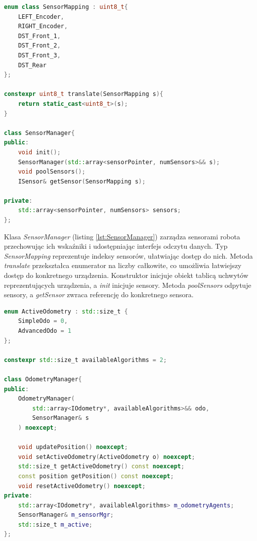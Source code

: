 \documentclass[12pt,twoside]{article}
\begin{document}
\begin{lstlisting}[language=C++, caption={Klasa SensorManager}, label={lst:SensorManager}]
enum class SensorMapping : uint8_t{ 
    LEFT_Encoder,
    RIGHT_Encoder,
    DST_Front_1,
    DST_Front_2,
    DST_Front_3,
    DST_Rear
};

constexpr uint8_t translate(SensorMapping s){
    return static_cast<uint8_t>(s);
}

class SensorManager{
public:
    void init();
    SensorManager(std::array<sensorPointer, numSensors>&& s);
    void poolSensors();
    ISensor& getSensor(SensorMapping s);

private:
    std::array<sensorPointer, numSensors> sensors;
};
\end{lstlisting}

Klasa \textit{SensorManager} (listing \ref{lst:SensorManager}) zarządza sensorami robota przechowując ich wskaźniki i udostępniając interfejs odczytu danych. Typ \textit{SensorMapping} reprezentuje indeksy sensorów, ułatwiając dostęp do nich. Metoda \textit{translate} przekształca enumerator na liczby całkowite, co umożliwia łatwiejszy dostęp do konkretnego urządzenia. Konstruktor inicjuje obiekt tablicą uchwytów reprezentujących urządzenia, a \textit{init} inicjuje sensory. Metoda \textit{poolSensors} odpytuje sensory, a \textit{getSensor} zwraca referencję do konkretnego sensora.

\newpage

\begin{lstlisting}[language=C++, caption={Klasa OdometryManager}, label={lst:OdometryManager}]
enum ActiveOdometry : std::size_t {
    SimpleOdo = 0,
    AdvancedOdo = 1
};

constexpr std::size_t availableAlgorithms = 2;

class OdometryManager{
public:
    OdometryManager(
        std::array<IOdometry*, availableAlgorithms>&& odo,
        SensorManager& s
    ) noexcept;

    void updatePosition() noexcept;
    void setActiveOdometry(ActiveOdometry o) noexcept;
    std::size_t getActiveOdometry() const noexcept;
    const position getPosition() const noexcept;
    void resetActiveOdometry() noexcept;
private:
    std::array<IOdometry*, availableAlgorithms> m_odometryAgents;
    SensorManager& m_sensorMgr;
    std::size_t m_active;
};
\end{lstlisting}
\end{document}
